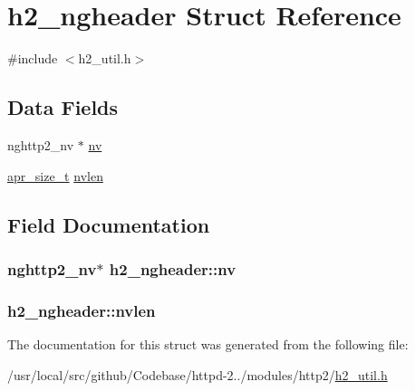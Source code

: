 \hypertarget{structh2__ngheader}{}\section{h2\+\_\+ngheader Struct Reference}
\label{structh2__ngheader}


{\ttfamily \#include $<$h2\+\_\+util.\+h$>$}

\subsection*{Data Fields}
\begin{DoxyCompactItemize}
\item 
nghttp2\+\_\+nv $\ast$ \hyperlink{structh2__ngheader_abc9c88383e0dba833c21bd28d321c506}{nv}
\item 
\hyperlink{group__apr__platform_gaaa72b2253f6f3032cefea5712a27540e}{apr\+\_\+size\+\_\+t} \hyperlink{structh2__ngheader_ac9d42acb47185c2db1b68f684663e1a4}{nvlen}
\end{DoxyCompactItemize}


\subsection{Field Documentation}
\subsubsection[{\texorpdfstring{nv}{nv}}]{\setlength{\rightskip}{0pt plus 5cm}nghttp2\+\_\+nv$\ast$ h2\+\_\+ngheader\+::nv}\hypertarget{structh2__ngheader_abc9c88383e0dba833c21bd28d321c506}{}\label{structh2__ngheader_abc9c88383e0dba833c21bd28d321c506}
\subsubsection[{\texorpdfstring{nvlen}{nvlen}}]{ h2\+\_\+ngheader\+::nvlen}\hypertarget{structh2__ngheader_ac9d42acb47185c2db1b68f684663e1a4}{}\label{structh2__ngheader_ac9d42acb47185c2db1b68f684663e1a4}


The documentation for this struct was generated from the following file\+:\begin{DoxyCompactItemize}
\item 
/usr/local/src/github/\+Codebase/httpd-\/2../modules/http2/\hyperlink{h2__util_8h}{h2\+\_\+util.\+h}\end{DoxyCompactItemize}
